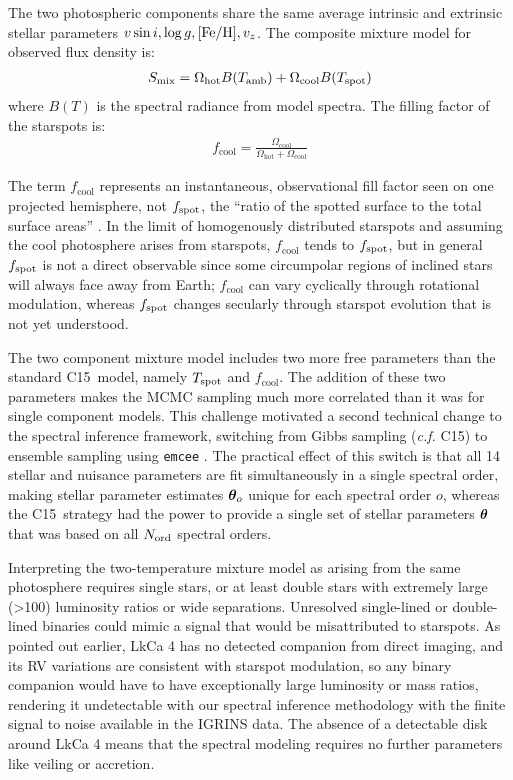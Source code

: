 \documentclass[twocolumn]{emulateapj}%
\newcommand{\iancze}{{\sc C15}}
\begin{document}
The two photospheric components share the same average intrinsic and extrinsic stellar parameters $v \sin i, \log g, [{\rm Fe}/{\rm H}], v_z$.  The composite mixture model for observed flux density is:
\begin{eqnarray} \label{eqn:mix_M}
S_{\mathrm{mix}} = \Omega_{\mathrm{hot}} B(T_\textrm{amb})  + \Omega_{\mathrm{cool}} B(T_\textrm{spot})
\end{eqnarray}
where $B(T)$ is the spectral radiance from model spectra.  The filling factor of the starspots is:
\begin{eqnarray} \label{eqn:fill_factor}
f_{\mathrm{cool}} = \frac{\Omega_{\mathrm{cool}}}{\Omega_{\mathrm{hot}} + \Omega_{\mathrm{cool}}}
\end{eqnarray}

The term $f_{\mathrm{cool}}$ represents an instantaneous, observational fill factor seen on one projected hemisphere, not $f_{\rm spot}$, the ``ratio of the spotted surface to the total surface areas'' \citep{somers15}.  In the limit of homogenously distributed starspots and assuming the cool photosphere arises from starspots, $f_{\mathrm{cool}}$ tends to $f_{\rm spot}$, but in general $f_{\rm spot}$ is not a direct observable since some circumpolar regions of inclined stars will always face away from Earth; $f_{\mathrm{cool}}$ can vary cyclically through rotational modulation, whereas $f_{\rm spot}$ changes secularly through starspot evolution that is not yet understood.

The two component mixture model includes two more free parameters than the standard \iancze\ model, namely $T_\textrm{spot}$ and $f_{\mathrm{cool}}$.  The addition of these two parameters makes the MCMC sampling much more correlated than it was for single component models.  This challenge motivated a second technical change to the spectral inference framework, switching from Gibbs sampling (\emph{c.f.} \iancze) to ensemble sampling using \texttt{emcee} \citep{foreman13}.  The practical effect of this switch is that all 14 stellar and nuisance parameters are fit simultaneously in a single spectral order, making stellar parameter estimates ${\bm \theta}_{o}$ unique for each spectral order $o$, whereas the \iancze\ strategy had the power to provide a single set of stellar parameters ${\bm \theta}$ that was based on all $N_{\rm ord}$ spectral orders.

Interpreting the two-temperature mixture model as arising from the same photosphere requires single stars, or at least double stars with extremely large (>100) luminosity ratios or wide separations.  Unresolved single-lined or double-lined binaries could mimic a signal that would be misattributed to starspots.  As pointed out earlier, LkCa 4 has no detected companion from direct imaging, and its RV variations are consistent with starspot modulation, so any binary companion would have to have exceptionally large luminosity or mass ratios, rendering it undetectable with our spectral inference methodology with the finite signal to noise available in the IGRINS data.  The absence of a detectable disk around LkCa 4 means that the spectral modeling requires no further parameters like veiling or accretion.
\end{document}
